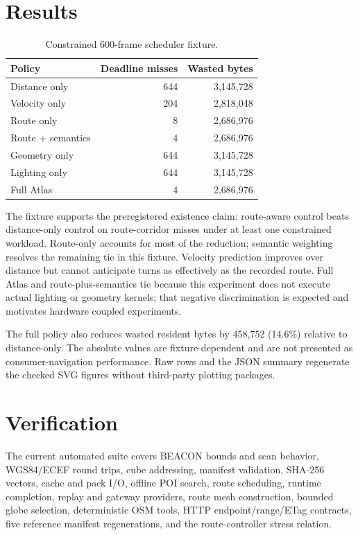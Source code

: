\documentclass[12pt]{article}
\begin{document}
\section{Results}
\begin{table}[h]
\centering
\small
\caption{Constrained 600-frame scheduler fixture.}
\begin{tabular}{lrr}
\toprule
Policy & Deadline misses & Wasted bytes\\
\midrule
Distance only & 644 & 3,145,728\\
Velocity only & 204 & 2,818,048\\
Route only & 8 & 2,686,976\\
Route + semantics & 4 & 2,686,976\\
Geometry only & 644 & 3,145,728\\
Lighting only & 644 & 3,145,728\\
Full Atlas & 4 & 2,686,976\\
\bottomrule
\end{tabular}
\end{table}

The fixture supports the preregistered existence claim: route-aware control beats distance-only
control on route-corridor misses under at least one constrained workload. Route-only accounts for
most of the reduction; semantic weighting resolves the remaining tie in this fixture. Velocity
prediction improves over distance but cannot anticipate turns as effectively as the recorded
route. Full Atlas and route-plus-semantics tie because this experiment does not execute actual
lighting or geometry kernels; that negative discrimination is expected and motivates hardware
coupled experiments.

The full policy also reduces wasted resident bytes by 458,752 (14.6\%) relative to distance-only.
The absolute values are fixture-dependent and are not presented as consumer-navigation performance.
Raw rows and the JSON summary regenerate the checked SVG figures without third-party plotting
packages.

\section{Verification}
The current automated suite covers BEACON bounds and scan behavior, WGS84/ECEF round trips, cube
addressing, manifest validation, SHA-256 vectors, cache and pack I/O, offline POI search, route
scheduling, runtime completion, replay and gateway providers, route mesh construction, bounded
globe selection, deterministic OSM tools, HTTP endpoint/range/ETag contracts, five reference
manifest regenerations, and the route-controller stress relation.
\end{document}
